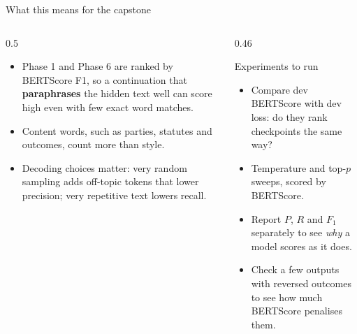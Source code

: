 \documentclass[aspectratio=169,11pt]{beamer}
\begin{document}
\begin{frame}{What this means for the capstone}
  \begin{columns}[T]
    \begin{column}{0.5\textwidth}
      \small
      \begin{itemize}
        \item Phase 1 and Phase 6 are ranked by BERTScore F1, so a continuation that \textbf{paraphrases} the hidden text well can score high even with few exact word matches.
        \item Content words, such as parties, statutes and outcomes, count more than style.
        \item Decoding choices matter: very random sampling adds off-topic tokens that lower precision; very repetitive text lowers recall.
      \end{itemize}
    \end{column}
    \begin{column}{0.46\textwidth}
      \begin{block}{Experiments to run}
        \small
        \begin{itemize}
          \item Compare dev BERTScore with dev loss: do they rank checkpoints the same way?
          \item Temperature and top-$p$ sweeps, scored by BERTScore.
          \item Report $P$, $R$ and $F_1$ separately to see \emph{why} a model scores as it does.
          \item Check a few outputs with reversed outcomes to see how much BERTScore penalises them.
        \end{itemize}
      \end{block}
    \end{column}
  \end{columns}
\end{frame}
\end{document}
